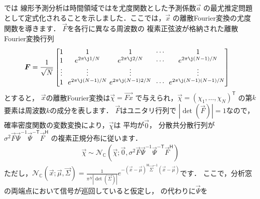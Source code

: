 では
線形予測分析は時間領域ではを尤度関数とした予測係数$\Vec{a}$
の最尤推定問題として定式化されることを示しました．ここでは，$\Vec{x}$
の離散Fourier変換の尤度関数を導きます．
$\Vec{F}$を各行に異なる周波数の
複素正弦波が格納された離散Fourier変換行列
\begin{align}
\Vec{F} 
&=
\frac{1}{\sqrt{N}}
\begin{bmatrix}
1&1&1&\cdots&1\\
1&e^{2\pi\j1/N}&e^{2\pi\j2/N}&\cdots&e^{2\pi\j(N-1)/N}\\
\vdots&\vdots&\vdots& &\vdots\\
1&\!\!e^{2\pi\j(N-1)/N}\!\!&\!\!e^{2\pi\j(N-1)2/N}\!\!&\!\!\cdots\!\!&\!\!e^{2\pi\j(N-1)(N-1)/N}
\end{bmatrix}
\end{align}
とすると，
$\Vec{x}$の離散Fourier変換は${\Vec{\chi}} = \Vec{Fx}$
で与えられ，$\Vec{\chi}=(\chi_1,\ldots,\chi_N)^{\mathsf T}$
の第$k$要素は周波数$k$の成分を表します．
$\Vec{F}$はユニタリ行列で
$|\det(\Vec{F})|=1$なので，確率密度関数の変数変換により，$\Vec{\chi}$は
平均が$\Vec{0}$，
分散共分散行列が$\sigma^2 \Vec{F}\Vec{\Psi}^{-1}\Vec{\Psi}^{- \mathsf T}\Vec{F}^{\mathsf H}$
の複素正規分布に従います．
\begin{align}
\Vec{\chi} \sim \mathcal{N}_{\mathbb{C}}(\Vec{\chi};\Vec{0},\sigma^2 
\Vec{F}\Vec{\Psi}^{-1}\Vec{\Psi}^{- \mathsf T}\Vec{F}^{\mathsf H})
\label{eq:c_pdf}
\end{align}
ただし，$\mathcal{N}_{\mathbb{C}}(\Vec{x};\Vec{\mu},\Vec{\Sigma}) = \frac{1}{\pi^N |\det(\Vec{\Sigma})|}e^{-(\Vec{x}-\Vec{\mu})^{\mathsf H}\Vec{\Sigma}^{-1}(\Vec{x}-\Vec{\mu})}$です．
ここで，分析窓の両端点において信号が巡回していると仮定し，
の代わりに$\Vec{\Psi}$を
